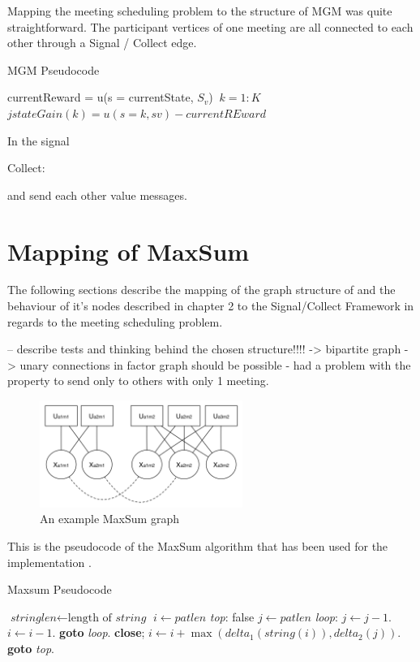 Mapping the meeting scheduling problem to the structure of MGM was quite straightforward. The participant vertices of one meeting are all connected to each other through a Signal / Collect edge.

\begin{algorithm}[H]
\caption{MGM Pseudocode}\label{euclid}
\begin{algorithmic}[2]
\State currentReward = u(s = currentState, \(S_{v}\))
\For $\ k = 1:K $
\State $j stateGain(k) = u(s = k, sv) - currentREward$
\EndFor
\end{algorithmic}
\end{algorithm}

In the signal 

Collect:

 and send each other value messages.

\section{Mapping of MaxSum}

The following sections describe the mapping of the graph structure of  and the behaviour of it's nodes described in chapter 2 to the Signal/Collect Framework  in regards to the meeting scheduling problem. 

-- describe tests and thinking behind the chosen structure!!!! -> bipartite graph -> unary connections in factor graph should be possible
- had a problem with the property to send only to others with only 1 meeting.

\begin{figure}[h]
\includegraphics[width=250px]{graphics/maxsum_graph}
\centering
\caption{An example MaxSum graph}
\label{fig:maxsum_graph}
\end{figure}


This is the pseudocode of the MaxSum algorithm that has been used for the implementation \cite{Zivan2012}.

\begin{algorithm}[H]
\caption{Maxsum Pseudocode}\label{euclid}
\begin{algorithmic}[3]
\State $\textit{stringlen} \gets \text{length of }\textit{string}$
\State $i \gets \textit{patlen}$
\BState \emph{top}:
 \Return false
\EndIf
\State $j \gets \textit{patlen}$
\BState \emph{loop}:
\State $j \gets j-1$.
\State $i \gets i-1$.
\State \textbf{goto} \emph{loop}.
\State \textbf{close};
\EndIf
\State $i \gets i+\max(\textit{delta}_1(\textit{string}(i)),\textit{delta}_2(j))$.
\State \textbf{goto} \emph{top}.
\EndProcedure
\end{algorithmic}
\end{algorithm}

